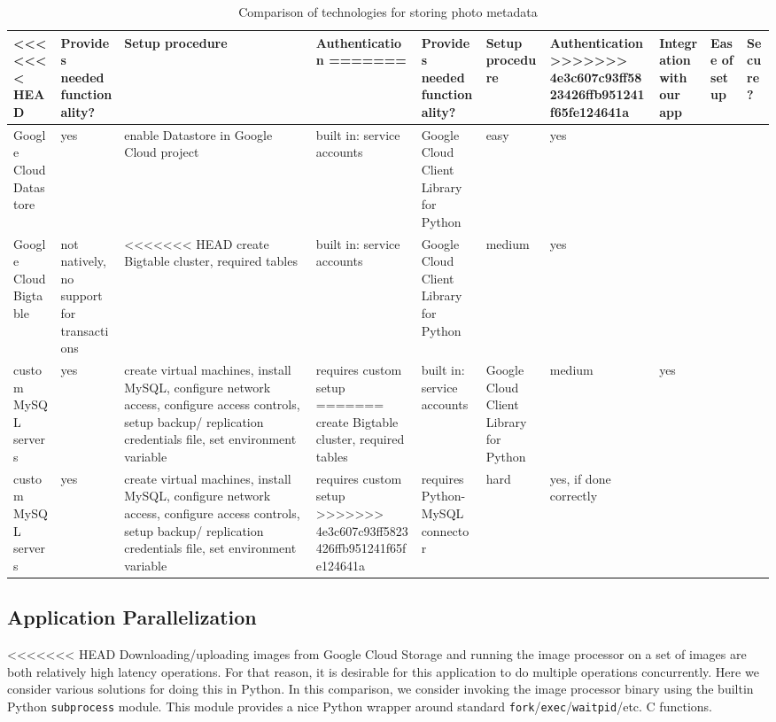 \documentclass[10pt, onecolumn, draftclsnofoot, letterpaper, compsoc]{IEEEtran}
\begin{document}
\begin{table}[h]
\centering
\caption{Comparison of technologies for storing photo metadata}
\begin{tabular}{|p{1.8cm}|p{1.4cm}|p{3cm}|p{1.8cm}|p{1.8cm}|p{1.8cm}|p{1cm}|}
\hline

<<<<<<< HEAD
 & Provides needed functionality? & Setup procedure & Authentication
=======
 & Provides needed functionality? & Setup procedure & Authentication
>>>>>>> 4e3c607c93ff5823426ffb951241f65fe124641a
 & Integration with our app & Ease of setup & Secure? \\ \hline

Google Cloud Datastore & yes & enable Datastore in Google Cloud project
& built in: service accounts & Google Cloud Client Library for Python
& easy & yes \\ \hline

Google Cloud Bigtable & not natively, no support for transactions &
<<<<<<< HEAD
create Bigtable cluster, required tables & built in: service accounts
& Google Cloud Client Library for Python & medium & yes \\ \hline

custom MySQL servers & yes & create virtual machines, install MySQL,
configure network access, configure access controls, setup backup/
replication credentials file, set environment variable & requires custom setup
=======
create Bigtable cluster, required tables & built in: service accounts
& Google Cloud Client Library for Python & medium & yes \\ \hline

custom MySQL servers & yes & create virtual machines, install MySQL,
configure network access, configure access controls, setup backup/
replication credentials file, set environment variable & requires custom setup
>>>>>>> 4e3c607c93ff5823426ffb951241f65fe124641a
& requires Python-MySQL connector & hard & yes, if done correctly \\ \hline

\end{tabular}
\label{table:bret2}
\end{table}

\subsection{Application Parallelization}

<<<<<<< HEAD
Downloading/uploading images from Google Cloud Storage and running the
image processor on a set of images are both relatively high latency operations.
For that reason, it is desirable for this application to do multiple operations
concurrently. Here we consider various solutions for doing this in Python. In
this comparison, we consider invoking the image processor binary using the
builtin Python {\tt subprocess} module. This module provides a nice Python wrapper
around standard {\tt fork}/{\tt exec}/{\tt waitpid}/etc. C functions. \\
\end{document}
